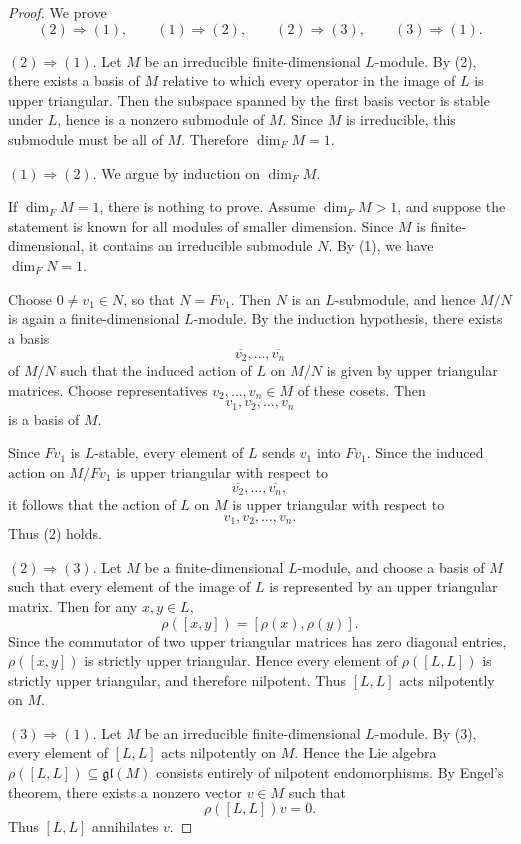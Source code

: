 \begin{proof}
    We prove
    \[
        (2)\Rightarrow(1),\qquad (1)\Rightarrow(2),\qquad (2)\Rightarrow(3),\qquad (3)\Rightarrow(1).
    \]

    $(2)\Rightarrow(1)$.
    Let $M$ be an irreducible finite-dimensional $L$-module. By (2), there exists a basis of $M$ relative to which every operator in the image of $L$ is upper triangular. Then the subspace spanned by the first basis vector is stable under $L$, hence is a nonzero submodule of $M$. Since $M$ is irreducible, this submodule must be all of $M$. Therefore $\dim_F M=1$.

    $(1)\Rightarrow(2)$.
    We argue by induction on $\dim_F M$.

    If $\dim_F M=1$, there is nothing to prove. Assume $\dim_F M>1$, and suppose the statement is known for all modules of smaller dimension. Since $M$ is finite-dimensional, it contains an irreducible submodule $N$. By (1), we have $\dim_F N=1$.

    Choose $0\neq v_1\in N$, so that $N=Fv_1$. Then $N$ is an $L$-submodule, and hence $M/N$ is again a finite-dimensional $L$-module. By the induction hypothesis, there exists a basis
    \[
        \overline{v_2},\dots,\overline{v_n}
    \]
    of $M/N$ such that the induced action of $L$ on $M/N$ is given by upper triangular matrices. Choose representatives $v_2,\dots,v_n\in M$ of these cosets. Then
    \[
        v_1,v_2,\dots,v_n
    \]
    is a basis of $M$.

    Since $Fv_1$ is $L$-stable, every element of $L$ sends $v_1$ into $Fv_1$. Since the induced action on $M/Fv_1$ is upper triangular with respect to
    \[
        \overline{v_2},\dots,\overline{v_n},
    \]
    it follows that the action of $L$ on $M$ is upper triangular with respect to
    \[
        v_1,v_2,\dots,v_n.
    \]
    Thus (2) holds.

    $(2)\Rightarrow(3)$.
    Let $M$ be a finite-dimensional $L$-module, and choose a basis of $M$ such that every element of the image of $L$ is represented by an upper triangular matrix. Then for any $x,y\in L$,
    \[
        \rho([x,y])=[\rho(x),\rho(y)].
    \]
    Since the commutator of two upper triangular matrices has zero diagonal entries, $\rho([x,y])$ is strictly upper triangular. Hence every element of $\rho([L,L])$ is strictly upper triangular, and therefore nilpotent. Thus $[L,L]$ acts nilpotently on $M$.

    $(3)\Rightarrow(1)$.
    Let $M$ be an irreducible finite-dimensional $L$-module. By (3), every element of $[L,L]$ acts nilpotently on $M$. Hence the Lie algebra $\rho([L,L])\subseteq \mathfrak{gl}(M)$ consists entirely of nilpotent endomorphisms. By Engel's theorem, there exists a nonzero vector $v\in M$ such that
    \[
        \rho([L,L])v=0.
    \]
    Thus $[L,L]$ annihilates $v$.


\end{proof}

